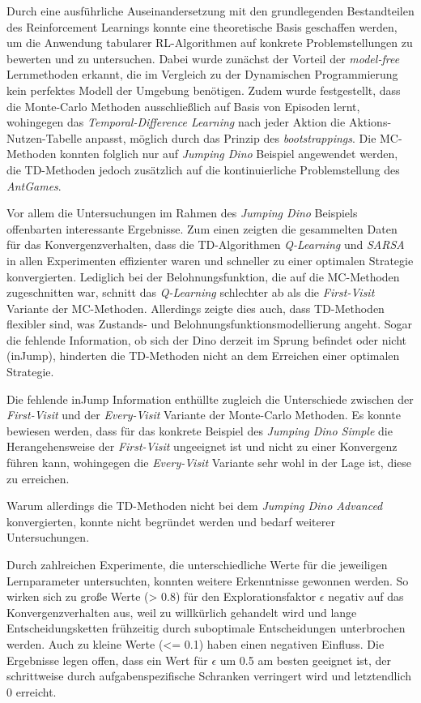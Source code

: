 Durch eine ausführliche Auseinandersetzung mit den grundlegenden Bestandteilen des Reinforcement Learnings konnte eine theoretische Basis geschaffen werden, um die Anwendung tabularer RL-Algorithmen auf konkrete Problemstellungen zu bewerten und zu untersuchen. Dabei wurde zunächst der Vorteil der \textit{model-free} Lernmethoden erkannt, die im Vergleich zu der Dynamischen Programmierung kein perfektes Modell der Umgebung benötigen.
Zudem wurde festgestellt, dass die Monte-Carlo Methoden ausschließlich  auf Basis von Episoden lernt, wohingegen das \textit{Temporal-Difference Learning} nach jeder Aktion die Aktions-Nutzen-Tabelle anpasst, möglich durch das Prinzip des \textit{bootstrappings}. Die MC-Methoden konnten folglich nur auf \textit{Jumping Dino} Beispiel angewendet werden, die TD-Methoden jedoch zusätzlich auf die kontinuierliche Problemstellung des \textit{AntGames}.
\par 
Vor allem die Untersuchungen im Rahmen des \textit{Jumping Dino} Beispiels offenbarten interessante Ergebnisse. Zum einen zeigten die gesammelten Daten für das Konvergenzverhalten, dass die TD-Algorithmen \textit{Q-Learning} und \textit{SARSA} in allen Experimenten effizienter waren und schneller zu einer optimalen Strategie konvergierten. Lediglich bei der Belohnungsfunktion, die auf die MC-Methoden zugeschnitten war, schnitt das \textit{Q-Learning} schlechter ab als die \textit{First-Visit} Variante der MC-Methoden. Allerdings zeigte dies auch, dass TD-Methoden flexibler sind, was Zustands- und Belohnungsfunktionsmodellierung angeht. Sogar die fehlende Information, ob sich der Dino derzeit im Sprung befindet oder nicht (\glqq inJump\grqq{}), hinderten die TD-Methoden nicht an dem Erreichen einer optimalen Strategie. 
\par 
Die fehlende \glqq inJump\grqq{} Information enthüllte zugleich die Unterschiede zwischen der \textit{First-Visit} und der \textit{Every-Visit} Variante der Monte-Carlo Methoden. Es konnte bewiesen werden, dass für das konkrete Beispiel des \textit{Jumping Dino Simple} die Herangehensweise der \textit{First-Visit} ungeeignet ist und nicht zu einer Konvergenz führen kann, wohingegen die \textit{Every-Visit} Variante sehr wohl in der Lage ist, diese zu erreichen.
\par 
Warum allerdings die TD-Methoden nicht bei dem \textit{Jumping Dino Advanced} konvergierten, konnte nicht begründet werden und bedarf weiterer Untersuchungen.
\par 
Durch zahlreichen Experimente, die unterschiedliche Werte für die jeweiligen Lernparameter untersuchten, konnten weitere Erkenntnisse gewonnen werden. So wirken sich zu große Werte (> 0.8) für den Explorationsfaktor $\epsilon$ negativ auf das Konvergenzverhalten aus, weil zu willkürlich gehandelt wird und lange Entscheidungsketten frühzeitig durch suboptimale Entscheidungen unterbrochen werden. Auch zu kleine Werte (<= 0.1) haben einen negativen Einfluss. Die Ergebnisse legen offen, dass ein Wert für $\epsilon$ um 0.5 am besten geeignet ist, der schrittweise durch aufgabenspezifische Schranken verringert wird und letztendlich 0 erreicht.
